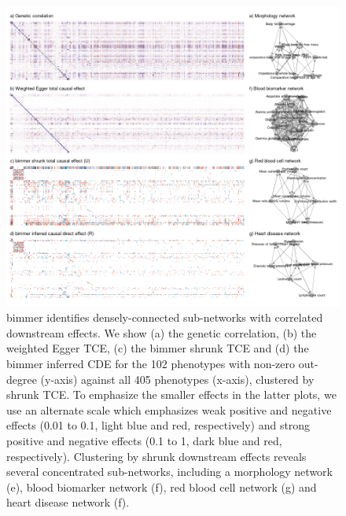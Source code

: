 \documentclass{article}
\begin{document}
\begin{figure}\label{figure5}
\includegraphics[width=\textwidth]{figures/figure5.png}
\caption{bimmer identifies densely-connected sub-networks with correlated downstream effects.
We show (a) the genetic correlation, (b) the weighted Egger TCE, (c) the bimmer shrunk
TCE and (d) the bimmer inferred CDE for the 102 phenotypes with non-zero out-degree (y-axis)
against all 405 phenotypes (x-axis), clustered by shrunk TCE. To emphasize the smaller effects
in the latter plots, we use an alternate scale which emphasizes weak positive and negative effects
(0.01 to 0.1, light blue and red, respectively) and strong positive and negative effects
(0.1 to 1, dark blue and red, respectively). Clustering by shrunk downstream effects reveals
several concentrated sub-networks, including a morphology network (e), blood biomarker
network (f), red blood cell network (g) and heart disease network (f).}
\end{figure}

\end{document}
